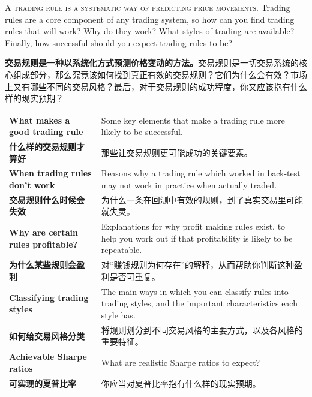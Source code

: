 
\begin{englishblock} \noindent\textsc{A trading rule is a systematic way of predicting price movements.} Trading rules are a core component of any trading system, so how can you find trading rules that will work? Why do they work? What styles of trading are available? Finally, how successful should you expect trading rules to be? \end{englishblock}

\begin{chineseblock} \noindent\textbf{交易规则是一种以系统化方式预测价格变动的方法。}交易规则是一切交易系统的核心组成部分，那么究竟该如何找到真正有效的交易规则？它们为什么会有效？市场上又有哪些不同的交易风格？最后，对于交易规则的成功程度，你又应该抱有什么样的现实预期？\end{chineseblock}


\begin{bilingualtableblock} \begin{tabularx}{\textwidth}{@{} p{} Y@{}}\textbf{What makes a good trading rule} & Some key elements that make a trading rule more likely to be successful. \\

\textbf{什么样的交易规则才算好} & 那些让交易规则更可能成功的关键要素。 \\
\textbf{When trading rules don't work} & Reasons why a trading rule which worked in back-test may not work in practice when actually traded. \\
\textbf{交易规则什么时候会失效} & 为什么一条在回测中有效的规则，到了真实交易里可能就失灵。 \\
\textbf{Why are certain rules profitable?} & Explanations for why profit making rules exist, to help you work out if that profitability is likely to be repeatable. \\
\textbf{为什么某些规则会盈利} & 对“赚钱规则为何存在”的解释，从而帮助你判断这种盈利是否可重复。 \\
\textbf{Classifying trading styles} & The main ways in which you can classify rules into trading styles, and the important characteristics each style has. \\
\textbf{如何给交易风格分类} & 将规则划分到不同交易风格的主要方式，以及各风格的重要特征。 \\
\textbf{Achievable Sharpe ratios} & What are realistic Sharpe ratios to expect? \\
\textbf{可实现的夏普比率} & 你应当对夏普比率抱有什么样的现实预期。 \\
\end{tabularx}
\end{bilingualtableblock}

